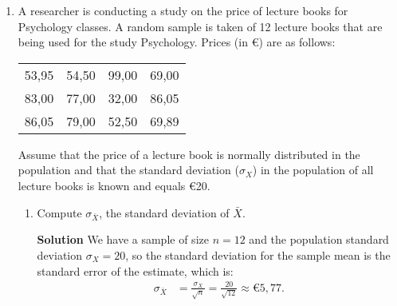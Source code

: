 \begin{enumerate}
    \item A researcher is conducting a study on the price of lecture books for Psychology classes. A random sample is taken of 12 lecture books that are being used for the study Psychology. Prices (in \euro{}) are as follows:
    \FloatBarrier
    \begin{table}[h]
    \centering
    \begin{tabular}{@{}llll@{}}
    \toprule
    53,95 & 54,50 & 99,00 & 69,00 \\
    83,00 & 77,00 & 32,00 & 86,05 \\
    86,05 & 79,00 & 52,50 & 69,89 \\ \bottomrule
    \end{tabular}
    \end{table}
    \FloatBarrier
    Assume that the price of a lecture book is normally distributed in the population and that the standard deviation ($\sigma_X$) in the population of all lecture books is known and equals \euro{20}.
    \begin{enumerate}
        \item Compute $\sigma_{\bar{X}}$, the standard deviation of $\bar{X}$.
        \begin{framed}{\textbf{Solution}}
        We have a sample of size $n=12$ and the population standard deviation $\sigma_X = 20$, so the standard deviation for the sample mean is the standard error of the estimate, which is:
        \begin{align}
            \sigma_{\bar{X}} &= \frac{\sigma_X}{\sqrt{n}} = \frac{20}{\sqrt{12}} \approx \euro{5,77}.
        \end{align}
        \end{framed}
        

\end{enumerate}
\end{enumerate}
